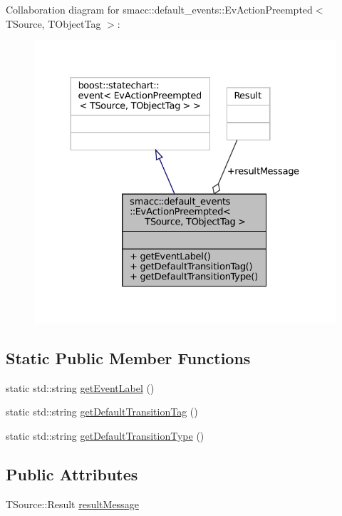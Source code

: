 Collaboration diagram for smacc\+:\+:default\+\_\+events\+:\+:Ev\+Action\+Preempted$<$ T\+Source, T\+Object\+Tag $>$\+:
\nopagebreak
\begin{figure}[H]
\begin{center}
\leavevmode
\includegraphics[width=330pt]{structsmacc_1_1default__events_1_1EvActionPreempted__coll__graph}
\end{center}
\end{figure}
\subsection*{Static Public Member Functions}
\begin{DoxyCompactItemize}
\item 
static std\+::string \hyperlink{structsmacc_1_1default__events_1_1EvActionPreempted_ae872ff61b26c07446358f41be00c8f59}{get\+Event\+Label} ()
\item 
static std\+::string \hyperlink{structsmacc_1_1default__events_1_1EvActionPreempted_a71e953e6cd08d825c85ffca7819a0145}{get\+Default\+Transition\+Tag} ()
\item 
static std\+::string \hyperlink{structsmacc_1_1default__events_1_1EvActionPreempted_a29edbbf19a68ab8930f2f3664c45c9e7}{get\+Default\+Transition\+Type} ()
\end{DoxyCompactItemize}
\subsection*{Public Attributes}
\begin{DoxyCompactItemize}
\item 
T\+Source\+::\+Result \hyperlink{structsmacc_1_1default__events_1_1EvActionPreempted_a38f3c09c9c672b82b08ea5ff2085280e}{result\+Message}
\end{DoxyCompactItemize}


